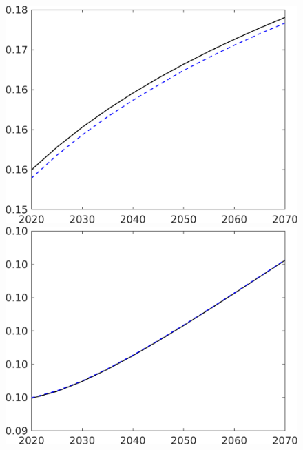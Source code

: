 \begin{figure}[h!!]
\begin{minipage}[]{0.32\textwidth}
	\end{minipage}
	\begin{minipage}[]{0.32\textwidth}
	\includegraphics[width=1\textwidth]{../../codding_model/own_basedOnFried/optimalPol_190722_tidiedUp/figures/all_10Aout22/CountTaul_modtest_target_LgLf_spillover0_sep1_extern0_PV1_etaa0.79_lgd0.png}
\end{minipage}
	\begin{minipage}[]{0.32\textwidth}
		\includegraphics[width=1\textwidth]{../../codding_model/own_basedOnFried/optimalPol_190722_tidiedUp/figures/all_10Aout22/CountTaul_modtest_target_sff_spillover0_sep1_extern0_PV1_etaa0.79_lgd0.png}

\end{minipage}
\end{figure}

